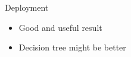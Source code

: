 \begin{frame}{Deployment}
    \begin{itemize}
        \item Good and useful result
        \item Decision tree might be better
    \end{itemize}
\end{frame}